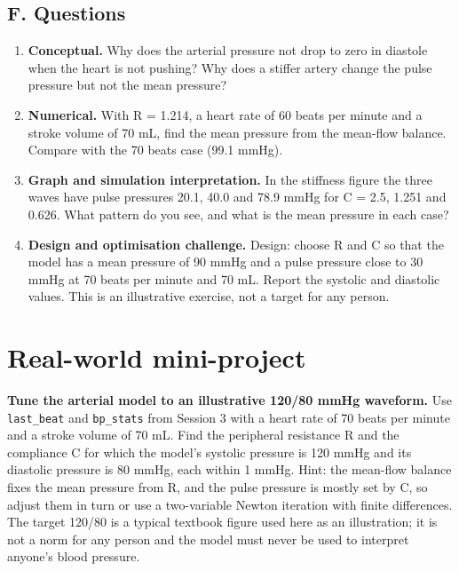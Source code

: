 \documentclass[11pt,a4paper]{article}
\begin{document}
\subsection*{F. Questions}
\begin{enumerate}[nosep]
\item \textbf{Conceptual.} Why does the arterial pressure not drop to zero in diastole when the heart is not pushing? Why does a stiffer artery change the pulse pressure but not the mean pressure?
\item \textbf{Numerical.} With R = 1.214, a heart rate of 60 beats per minute and a stroke volume of 70 mL, find the mean pressure from the mean-flow balance. Compare with the 70 beats case (99.1 mmHg).
\item \textbf{Graph and simulation interpretation.} In the stiffness figure the three waves have pulse pressures 20.1, 40.0 and 78.9 mmHg for C = 2.5, 1.251 and 0.626. What pattern do you see, and what is the mean pressure in each case?
\item \textbf{Design and optimisation challenge.} Design: choose R and C so that the model has a mean pressure of 90 mmHg and a pulse pressure close to 30 mmHg at 70 beats per minute and 70 mL. Report the systolic and diastolic values. This is an illustrative exercise, not a target for any person.
\end{enumerate}

\section{Real-world mini-project}
\textbf{Tune the arterial model to an illustrative 120/80 mmHg waveform.} Use \texttt{last\_beat} and \texttt{bp\_stats} from Session 3 with a heart rate of 70 beats per minute and a stroke volume of 70 mL. Find the peripheral resistance R and the compliance C for which the model's systolic pressure is 120 mmHg and its diastolic pressure is 80 mmHg, each within 1 mmHg. Hint: the mean-flow balance fixes the mean pressure from R, and the pulse pressure is mostly set by C, so adjust them in turn or use a two-variable Newton iteration with finite differences. The target 120/80 is a typical textbook figure used here as an illustration; it is not a norm for any person and the model must never be used to interpret anyone's blood pressure.
\end{document}
